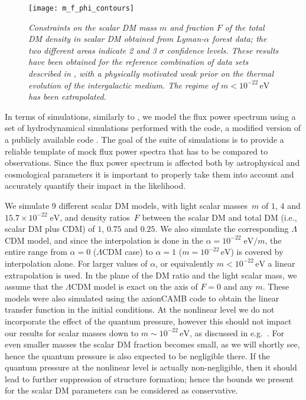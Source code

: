 \documentclass[11pt,nofootinbib]{article}
\numberwithin{equation}{section}
\begin{document}
\begin{figure}[t]
  \begin{center}
  \begin{center}
  \texttt{[image: m\_f\_phi\_contours]}
  \end{center}
   \caption{\emph{Constraints on the scalar DM mass $m$ and
   fraction $F$ of the total DM density in scalar DM obtained from Lyman-$\alpha$ forest data; the two different areas indicate 2 and 3 $\sigma$ confidence levels.
   These results have been obtained for the reference combination of
  data sets described in \cite{Irsic:2017yje}, with a physically
  motivated weak prior on the thermal evolution of the intergalactic
  medium. The regime of $m < 10^{-22}\, \mathrm{eV}$ has been
  extrapolated.}}
  \label{fig:m-f}
  \end{center}
\end{figure}


In terms of simulations, similarly to \cite{Irsic:2017yje}, we model the flux power
spectrum using a set of hydrodynamical simulations performed with the
{} code, a modified version of a publicly available {}
code \cite{springel05}. The goal of the suite of simulations is to provide a reliable 
template of mock flux power spectra that has to be compared to observations.
Since the flux power spectrum is affected both by astrophysical and cosmological parameters
it is important to properly take them into account and accurately quantify their impact in the likelihood.

We simulate 9 different scalar DM models, with light scalar masses~$m$ of $1$,
$4$ and $15.7 \times 10^{-22}\;\mathrm{eV}$, and
density ratios~$F$ between the scalar DM and total DM (i.e., scalar DM
plus CDM) of $1$, $0.75$ and $0.25$. We also simulate the corresponding $\Lambda$CDM
model, and since the interpolation is done in the
$\alpha=10^{-22}\;\mathrm{eV}/m$, the entire range from $\alpha=0$
($\Lambda$CDM case) to
$\alpha=1$ ($m = 10^{-22}\, \mathrm{eV}$) is covered by interpolation alone. For larger values of
$\alpha$, or equivalently $m < 10^{-22}\, \mathrm{eV}$ a linear
extrapolation is used. In the plane of the DM ratio and the light scalar mass, we
assume that the $\Lambda$CDM model is exact on the axis of $F=0$ and
any $m$. These models were also simulated using the axionCAMB
code \cite{Hlozek:2014lca} to obtain the linear transfer function in the
initial conditions.
At the nonlinear level we do not incorporate the effect of the quantum
pressure, however this should not impact our results for scalar masses down to
$m \sim 10^{-22}\, \mathrm{eV}$, as discussed in
e.g.~\cite{Irsic:2017yje,Schive:2015kza}. 
For even smaller masses the scalar DM fraction becomes small, as we will
shortly see, hence the quantum pressure is also expected to be
negligible there.
If the quantum pressure at the nonlinear level is actually
non-negligible, then it should lead to further suppression of structure
formation; hence the bounds we present for the scalar DM parameters can
be considered as conservative. 
\end{document}
